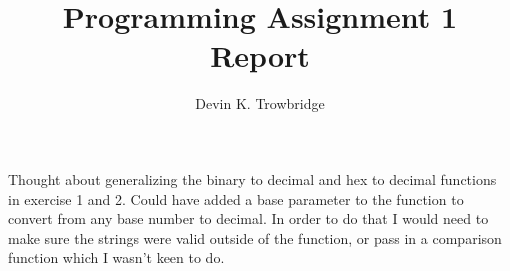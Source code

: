 \documentclass[a4paper,10pt]{article}
\title{Programming Assignment 1 Report}
\author{Devin K. Trowbridge}
\begin{document}
\maketitle

Thought about generalizing the binary to decimal and hex to decimal functions in exercise 1 and 2. Could have added a base parameter to the function to convert from any base number to decimal. In order to do that I would need to make sure the strings were valid outside of the function, or pass in a comparison function which I wasn't keen to do.
\end{document}
